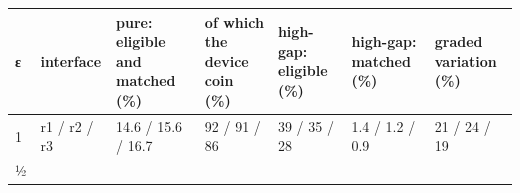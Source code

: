 \documentclass[10pt]{article}
\begin{document}
\begin{longtable}[]{@{}lllllll@{}}
\toprule
\begin{minipage}[b]{0.12\columnwidth}\raggedright
ε\strut
\end{minipage} & \begin{minipage}[b]{0.12\columnwidth}\raggedright
interface\strut
\end{minipage} & \begin{minipage}[b]{0.12\columnwidth}\raggedright
pure: eligible and matched (\%)\strut
\end{minipage} & \begin{minipage}[b]{0.12\columnwidth}\raggedright
of which the device coin (\%)\strut
\end{minipage} & \begin{minipage}[b]{0.12\columnwidth}\raggedright
high-gap: eligible (\%)\strut
\end{minipage} & \begin{minipage}[b]{0.12\columnwidth}\raggedright
high-gap: matched (\%)\strut
\end{minipage} & \begin{minipage}[b]{0.12\columnwidth}\raggedright
graded variation (\%)\strut
\end{minipage}\tabularnewline
\midrule
\endhead
\begin{minipage}[t]{0.12\columnwidth}\raggedright
1\strut
\end{minipage} & \begin{minipage}[t]{0.12\columnwidth}\raggedright
r1 / r2 / r3\strut
\end{minipage} & \begin{minipage}[t]{0.12\columnwidth}\raggedright
14.6 / 15.6 / 16.7\strut
\end{minipage} & \begin{minipage}[t]{0.12\columnwidth}\raggedright
92 / 91 / 86\strut
\end{minipage} & \begin{minipage}[t]{0.12\columnwidth}\raggedright
39 / 35 / 28\strut
\end{minipage} & \begin{minipage}[t]{0.12\columnwidth}\raggedright
1.4 / 1.2 / 0.9\strut
\end{minipage} & \begin{minipage}[t]{0.12\columnwidth}\raggedright
21 / 24 / 19\strut
\end{minipage}\tabularnewline
\begin{minipage}[t]{0.12\columnwidth}\raggedright
½\strut

\end{minipage}
\end{longtable}
\end{document}

